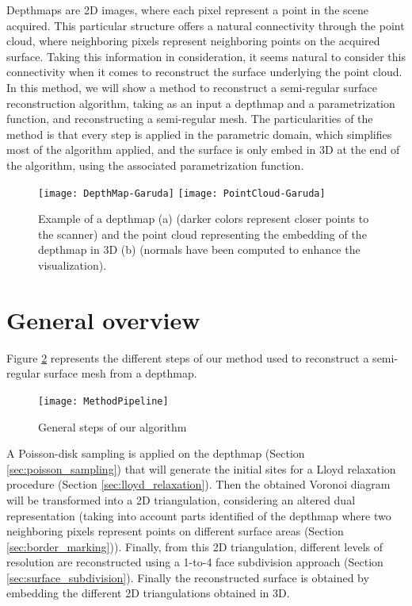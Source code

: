 \documentclass[11pt,fleqn]{book} %
\begin{document}
Depthmaps are 2D images, where each pixel represent a point in the scene acquired. This particular structure offers a natural connectivity through the point cloud, where neighboring pixels represent neighboring points on the acquired surface.
Taking this information in consideration, it seems natural to consider this connectivity when it comes to reconstruct the surface underlying the point cloud. 
In this method, we will show a method to reconstruct a semi-regular surface reconstruction algorithm, taking as an input a depthmap and a parametrization function, and reconstructing a semi-regular mesh.
The particularities of the method is that every step is applied in the parametric domain, which simplifies most of the algorithm applied, and the surface is only embed in 3D at the end of the algorithm, using the associated parametrization function.

\begin{figure}[ht]
\centering\texttt{[image: DepthMap-Garuda]}
\centering\texttt{[image: PointCloud-Garuda]}
\caption{Example of a depthmap (a) (darker colors represent closer points to the scanner) and the point cloud representing the embedding of the depthmap in 3D (b) (normals have been computed to enhance the visualization).}
\label{fig:depthmap_point_cloud}
\end{figure}


\section{General overview}
\label{sec:general_overview}

Figure \ref{fig:general_steps} represents the different steps of our method used to reconstruct a semi-regular surface mesh from a depthmap.

\begin{figure}[ht]
\centering\texttt{[image: MethodPipeline]}
\caption{General steps of our algorithm}
\label{fig:general_steps}
\end{figure}

A Poisson-disk sampling is applied on the depthmap (Section \ref{sec:poisson_sampling}) that will generate the initial sites for a Lloyd relaxation procedure (Section \ref{sec:lloyd_relaxation}). 
Then the obtained Voronoi diagram will be transformed into a 2D triangulation, considering an altered dual representation (taking into account parts identified of the depthmap where two neighboring pixels represent points on different surface areas (Section \ref{sec:border_marking})). 
Finally, from this 2D triangulation, different levels of resolution are reconstructed using a 1-to-4 face subdivision approach (Section \ref{sec:surface_subdivision}).
Finally the reconstructed surface is obtained by embedding the different 2D triangulations obtained in 3D.
\end{document}
